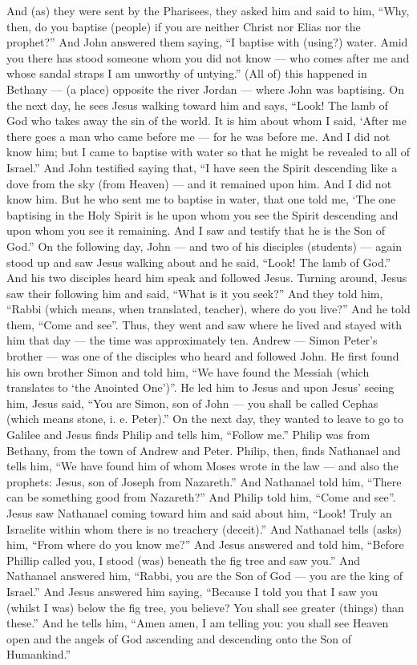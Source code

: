 \begin{pages}
\begin{Leftside}
		\pend
		\pstart
		And (as) they were sent by the Pharisees, they asked him and said to him, “Why, then, do you baptise (people) if you are neither Christ nor Elias nor the prophet?” And John answered them saying, “I baptise with (using?) water. Amid you there has stood someone whom you did not know — who comes after me and whose sandal straps I am unworthy of untying.” (All of) this happened in Bethany — (a place) opposite the river Jordan — where John was baptising. 
		\pend
		\pstart
		On the next day, he sees Jesus walking toward him and says, “Look! The lamb of God who takes away the sin of the world. It is him about whom I said, ‘After me there goes a man who came before me — for he was before me. And I did not know him; but I came to baptise with water so that he might be revealed to all of Israel.” And John testified saying that, “I have seen the Spirit descending like a dove from the sky (from Heaven) — and it remained upon him. And I did not know him. But he who sent me to baptise in water, that one told me, ‘The one baptising in the Holy Spirit is he upon whom you see the Spirit descending and upon whom you see it remaining. And I saw and testify that he is the Son of God.” 
		\pend
		\pstart
		On the following day, John — and two of his disciples (students) — again stood up and saw Jesus walking about and he said, “Look! The lamb of God.” And his two disciples heard him speak and followed Jesus. Turning around, Jesus saw their following him and said, “What is it you seek?” And they told him, “Rabbi (which means, when translated, teacher), where do you live?” And he told them, “Come and see”. Thus, they went and saw where he lived and stayed with him that day — the time was approximately ten. Andrew — Simon Peter’s brother — was one of the disciples who heard and followed John. He first found his own brother Simon and told him, “We have found the Messiah (which translates to ‘the Anointed One’)”. He led him to Jesus and upon Jesus’ seeing him, Jesus said, “You are Simon, son of John — you shall be called Cephas (which means stone, i. e. Peter).”
		\pend
		\pstart
		On the next day, they wanted to leave to go to Galilee and Jesus finds Philip and tells him, “Follow me.” Philip was from Bethany, from the town of Andrew and Peter. Philip, then, finds Nathanael and tells him, “We have found him of whom Moses wrote in the law — and also the prophets: Jesus, son of Joseph from Nazareth.” And Nathanael told him, “There can be something good from Nazareth?” And Philip told him, “Come and see”. Jesus saw Nathanael coming toward him and said about him, “Look! Truly an Israelite within whom there is no treachery (deceit).” And Nathanael tells (asks) him, “From where do you know me?” And Jesus answered and told him, “Before Phillip called you, I stood (was) beneath the fig tree and saw you.” And Nathanael answered him, “Rabbi, you are the Son of God — you are the king of Israel.” And Jesus answered him saying, “Because I told you that I saw you (whilst I was) below the fig tree, you believe? You shall see greater (things) than these.” And he tells him, “Amen amen, I am telling you: you shall see Heaven open and the angels of God ascending and descending onto the Son of Humankind.”

\end{Leftside}
\end{pages}
